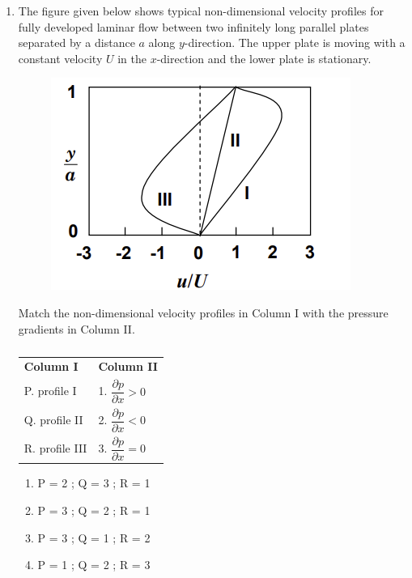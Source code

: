 \documentclass[12pt]{article}
\begin{document}
\begin{enumerate}
(GATE XE 2012)

\item The figure given below shows typical non-dimensional velocity profiles for fully developed laminar flow between two infinitely long parallel plates separated by a distance $a$ along $y$-direction. The upper plate is moving with a constant velocity $U$ in the $x$-direction and the lower plate is stationary.  

\begin{figure}[H]
    \centering
    \includegraphics[width=0.5\columnwidth]{figs/ass2_b_q14.png}
    \caption{}
    \label{fig:placeholder}
\end{figure}

Match the non-dimensional velocity profiles in Column I with the pressure gradients in Column II.

\begin{center}
\begin{table}[H]
\centering
\caption{} \label{}
\begin{tabular}{l l}

\textbf{Column I} & \textbf{Column II} \\
P. profile I & 1. $\dfrac{\partial p}{\partial x} > 0$ \\
Q. profile II & 2. $\dfrac{\partial p}{\partial x} < 0$ \\
R. profile III & 3. $\dfrac{\partial p}{\partial x} = 0$ \\
\end{tabular}
\end{table}
\end{center}

\begin{multicols}{2}
\begin{enumerate}
\item P = 2 ; Q = 3 ; R = 1
\item P = 3 ; Q = 2 ; R = 1
\item P = 3 ; Q = 1 ; R = 2
\item P = 1 ; Q = 2 ; R = 3
\end{enumerate}
\end{multicols}


\end{enumerate}
\end{document}
